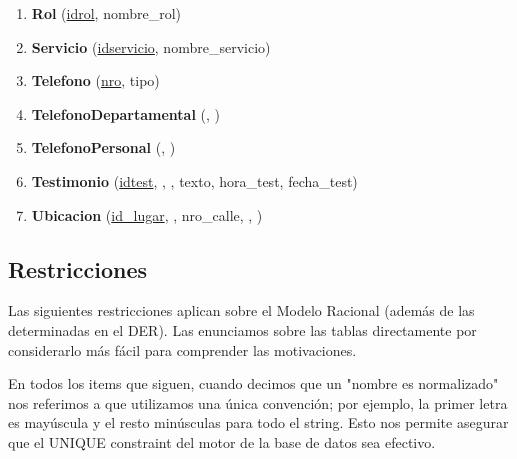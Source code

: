 \documentclass{article}
\theoremstyle{definition}
\theoremstyle{remark}
\begin{document}
\begin{enumerate}
\item \textbf{Rol} (\underline{idrol}, nombre\_rol)
\item \textbf{Servicio} (\underline{idservicio}, nombre\_servicio)
\item \textbf{Telefono} (\underline{nro}, tipo)
\item \textbf{TelefonoDepartamental} (, )
\item \textbf{TelefonoPersonal} (, )
\item \textbf{Testimonio} (\underline{idtest}, , , texto, hora\_test, fecha\_test)
\item \textbf{Ubicacion} (\underline{id\_lugar}, , nro\_calle, , )
\end{enumerate}
\pagebreak

\subsection{Restricciones}

Las siguientes restricciones aplican sobre el Modelo Racional (además de las determinadas en el DER). Las enunciamos sobre las tablas directamente por considerarlo más fácil para comprender las motivaciones.

En todos los items que siguen, cuando decimos que un "nombre es normalizado" nos referimos a que utilizamos una única convención; por ejemplo, la primer letra es mayúscula y el resto minúsculas para todo el string. Esto nos permite asegurar que el UNIQUE constraint del motor de la base de datos sea efectivo.
\end{document}
